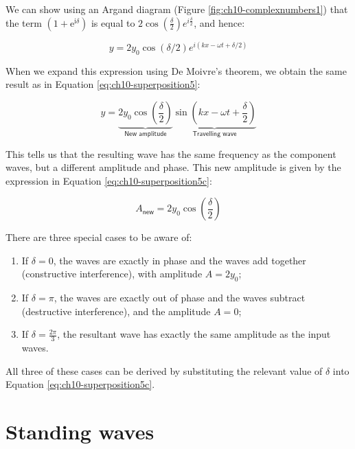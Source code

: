 \documentclass[
]{book}
\providecommand{\tightlist}{%
  \setlength{\itemsep}{0pt}\setlength{\parskip}{0pt}}
\begin{document}
We can show using an Argand diagram (Figure \ref{fig:ch10-complexnumbers1}) that the term \((1 + \mathrm{e}^{\mathrm{i}\delta})\) is equal to \(2\cos \left(\frac{\delta}{2}\right)e^{i\frac{\delta}{2}}\), and hence:

\begin{equation}
y = 2y_0 \cos(\delta/2) e^{i(kx-\omega t + \delta/2)}
\end{equation}

When we expand this expression using De Moivre's theorem, we obtain the same result as in Equation \eqref{eq:ch10-superposition5}:

\begin{equation}
y = \underbrace{2 y_0 \cos \left( \frac{\delta}{2} \right)}_{\textsf{New amplitude}} \underbrace{\sin \left( kx - \omega t + \frac{\delta}{2} \right)}_{\textsf{Travelling wave}}
\label{eq:ch10-superposition5b} 
\end{equation}

This tells us that the resulting wave has the same frequency as the component waves, but a different amplitude and phase. This new amplitude is given by the expression in Equation \eqref{eq:ch10-superposition5c}:

\begin{equation}
A_{\textsf{new}} = 2 y_0 \cos \left( \frac{\delta}{2} \right)
\label{eq:ch10-superposition5c} 
\end{equation}

There are three special cases to be aware of:

\begin{enumerate}
\def\labelenumi{\arabic{enumi}.}
\tightlist
\item
  If \(\delta = 0\), the waves are exactly in phase and the waves add together (constructive interference), with amplitude \(A = 2 y_0\);
\item
  If \(\delta = \pi\), the waves are exactly out of phase and the waves subtract (destructive interference), and the amplitude \(A = 0\);
\item
  If \(\delta = \frac{2\pi}{3}\), the resultant wave has exactly the same amplitude as the input waves.
\end{enumerate}

All three of these cases can be derived by substituting the relevant value of \(\delta\) into Equation \eqref{eq:ch10-superposition5c}.

\hypertarget{sec-ch10-standingwaves1}{%
\section{Standing waves}\label{sec-ch10-standingwaves1}}
\end{document}
